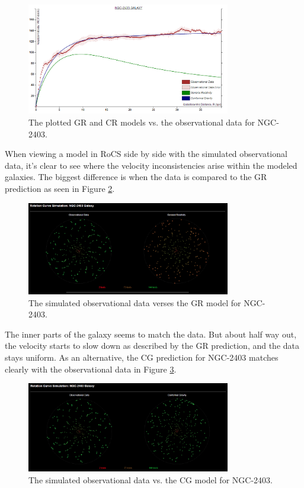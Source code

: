\documentclass[conference]{IEEEtran}
\begin{document}
\begin{figure}[h!]
\centering
\includegraphics[width=3.5in, frame]{NGC-2403-PLOT}
\caption{The plotted GR and CR models vs. the observational data for NGC-2403.}
\label{ngc2403plot}
\end{figure}

When viewing a model in RoCS side by side with the simulated observational data, it's clear to see where the velocity inconsistencies arise within the modeled galaxies. The biggest difference is when the data is compared to the GR prediction as seen in Figure \ref{ngc2403gr}.

\begin{figure}[h!]
\centering
\includegraphics[width=3.5in]{NGC-2403-GR}
\caption{The simulated observational data verses the GR model for NGC-2403.}
\label{ngc2403gr}
\end{figure}

The inner parts of the galaxy seems to match the data. But about half way out, the velocity starts to slow down as described by the GR prediction, and the data stays uniform. As an alternative, the CG prediction for NGC-2403 matches clearly with the observational data in Figure \ref{ngc2403cg}.

\begin{figure}[h!]
\centering
\includegraphics[width=3.5in]{NGC-2403-CG}
\caption{The simulated observational data vs. the CG model for NGC-2403.}
\label{ngc2403cg}
\end{figure}
 \newpage
\end{document}
